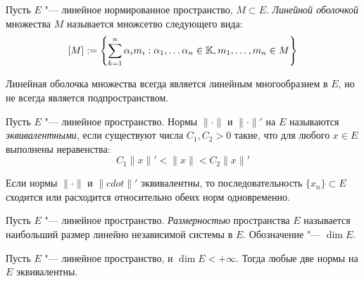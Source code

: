 \begin{definition}
	Пусть $E$ "--- линейное нормированное пространство, $M \subset E$. \textit{Линейной оболочкой} множества $M$ называется множсетво следующего вида:
	\[[M] := \left\{\sum_{k = 1}^n \alpha_im_i : \alpha_1, \dotsc \alpha_n \in \mathbb{K}, m_1, \dotsc, m_n \in M\right\}\]
\end{definition}

\begin{note}
	Линейная оболочка множества всегда является линейным многообразием в $E$, но не всегда является подпространством.
\end{note}

\begin{definition}
	Пусть $E$ "--- линейное пространство. Нормы $\|\cdot\|$ и $\|\cdot\|'$ на $E$ называются \textit{эквивалентными}, если существуют числа $C_1, C_2 > 0$ такие, что для любого $x \in E$ выполнены неравенства:
	\[C_1\|x\|' < \|x\| < C_2\|x\|'\]
\end{definition}

\begin{note}
	Если нормы $\|\cdot\|$ и $\|cdot\|'$ эквивалентны, то последовательность $\{x_n\} \subset E$ сходится или расходится относительно обеих норм одновременно.
\end{note}

\begin{definition}
	Пусть $E$ "--- линейное пространство. \textit{Размерностью} пространства $E$ называется наибольший размер линейно независимой системы в $E$. Обозначение "--- $\dim E$.
\end{definition}

\begin{proposition}\label{normequiv}
	Пусть $E$ "--- линейное пространство, и $\dim E < +\infty$. Тогда любые две нормы на $E$ эквивалентны.
\end{proposition}

